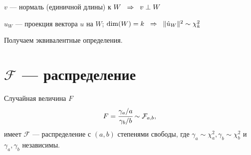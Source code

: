 \documentclass[12pt]{article} %
\theoremstyle{definition} %
\def \hu{\hat{u}}
\def \cF{\mathcal{F}}
\def \cChi{\mathcal{\chi}}
\begin{document}
   

 $v$ — нормаль (единичной длины) к $W \hspace{0.2cm} \Rightarrow \hspace{0.2cm} v \perp W$ \par
 $\hu_W$ — проекция вектора $u$ на $W$; $\dim(W)=k \hspace{0.2cm} \Rightarrow \hspace{0.2cm} \lVert \hu_W \rVert ^2 \sim \cChi_k^2 \hspace{0.2cm}$ \par
 Получаем эквивалентные определения.


\section{$\cF$ — распределение}
\begin{classic_def}\hspace{2cm} \par
    \smallskip
    Случайная величина $F$
    \[
        F = \cfrac{\gamma_a/a}{\gamma_b/b} \sim \cF_{a,b}, 
    \]
    имеет $\cF$ — распределение с $(a,b)$ степенями свободы, где $\gamma_a \sim \cChi_{a}^2, \gamma_b \sim \cChi_{b}^2$ и $\gamma_a, \gamma_b$ независимы.
    \end{classic_def}
\end{document}
